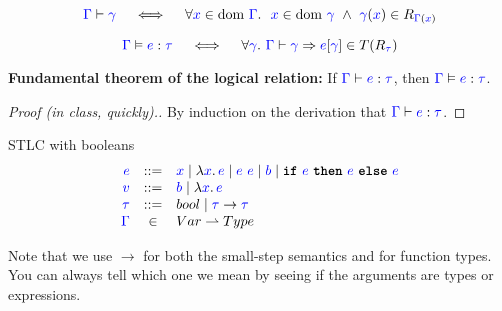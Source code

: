 \documentclass{article}
\newcommand{\meta}[1]{{\color{blue}#1}}
\newcommand{\stlc}{\textsc{STLC}}
\newcommand{\dom}[1]{\ensuremath{\text{dom}\ #1}}
\newcommand{\progtext}[1]{\ensuremath{\text{\ttfamily\bfseries #1}}}
\newcommand{\progif}{\progtext{if}}
\newcommand{\progthen}{\progtext{then}}
\newcommand{\progelse}{\progtext{else}}
\newcommand{\progtrue}{\progtext{true}}
\newcommand{\progfalse}{\progtext{false}}
\begin{document}
  \noindent\boxed{\meta{\Gamma}\vdash\meta{\gamma}}
  \[
    \meta{\Gamma}\vdash\meta{\gamma} \quad\iff\quad \forall\meta{x}\in\dom{\meta{\Gamma}}.\ \ \meta{x} \in\dom{\meta{\gamma}}\ \wedge\ \meta{\gamma}(\meta{x}) \in R_{\meta{\Gamma}(\meta{x})}
  \]

  \noindent\boxed{\meta{\Gamma}\vDash\meta{e} : \meta{\tau}}
  \[
    \meta{\Gamma}\vDash\meta{e} : \meta{\tau} \quad\iff\quad \forall\meta{\gamma}.\ \meta{\Gamma}\vdash\meta{\gamma}\Rightarrow \meta{e}[\meta{\gamma}] \in T(R_{\meta{\tau}})
  \]
  
  \vspace{3mm}
  \noindent\textbf{Fundamental theorem of the logical relation:}
  If $\meta{\Gamma}\vdash\meta{e}:\meta{\tau}$, then $\meta{\Gamma}\vDash\meta{e}:\meta{\tau}$.
  \begin{proof}[Proof (in class, quickly).]
    By induction on the derivation that $\meta{\Gamma}\vdash\meta{e}:\meta{\tau}$.
  \end{proof}

\clearpage
  \noindent\stlc{} with booleans
  \[
    \begin{array}{rcl}
      \meta{e} & ::= & \meta{x} \mid \lambda \meta{x}.\,\meta{e} \mid \meta{e}\ \meta{e}\mid \meta{b} \mid \progif\ \meta{e}\ \progthen\ \meta{e}\ \progelse\ \meta{e}\\
      \meta{v} & ::= & \meta{b} \mid \lambda \meta{x}.\,\meta{e}\\
      \meta{\tau} & ::= & bool \mid \meta{\tau} \to \meta{\tau}\\
      \meta{\Gamma} & \in & Var \rightharpoonup Type
    \end{array}
  \]
  \boxed{\meta{e} \to \meta{e}}
  Note that we use $\to$ for both the small-step semantics and for function types.
  You can always tell which one we mean by seeing if the arguments are types or expressions.
\end{document}
